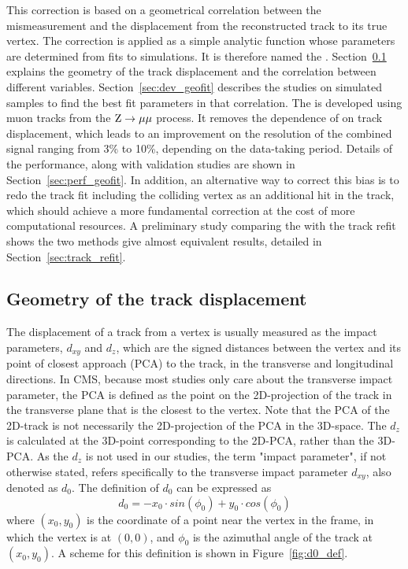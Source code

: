 This correction is based on a geometrical correlation between the \pt mismeasurement 
and the displacement from the reconstructed track to its true vertex.
The correction is applied as a simple analytic function whose parameters are determined from fits to simulations.
It is therefore named the \GeoFit.
Section~\ref{sec:d0_geometry} explains the geometry of the track displacement and the correlation between different variables.
Section~\ref{sec:dev_geofit} describes the studies on simulated samples to find the best fit parameters in that correlation.
The \GeoFit is developed using muon tracks from the $\mathrm{Z} \to \mu\mu$ process.
It removes the dependence of \mmm on track displacement, which leads to an 
improvement on the \mmm resolution of the combined signal ranging from 3\% to 10\%, depending on the data-taking period.
Details of the \GeoFit performance, along with validation studies are shown in Section~\ref{sec:perf_geofit}.
In addition, an alternative way to correct this \pt bias is to redo the track fit including the colliding vertex as an additional hit in the track, 
which should achieve a more fundamental correction at the cost of more computational resources.
A preliminary study comparing the \GeoFit with the track refit shows the two methods give almost equivalent results,
detailed in Section~\ref{sec:track_refit}.


\subsection{Geometry of the track displacement}\label{sec:d0_geometry}

The displacement of a track from a vertex is usually measured as the impact parameters, $d_{xy}$ and $d_{z}$,
which are the signed distances between the vertex and its point of closest approach (PCA) to the track, in the transverse and longitudinal directions.
In CMS, because most studies only care about the transverse impact parameter, 
the PCA is defined as the point on the 2D-projection of the track in the transverse plane that is the closest to the vertex.
Note that the PCA of the 2D-track is not necessarily the 2D-projection of the PCA in the 3D-space. 
The $d_{z}$ is calculated at the 3D-point corresponding to the 2D-PCA, rather than the 3D-PCA.
As the $d_{z}$ is not used in our studies, the term "impact parameter", if not otherwise stated,
refers specifically to the transverse impact parameter $d_{xy}$, also denoted as $d_{0}$.
The definition of $d_0$ can be expressed as 
\begin{equation}\label{eq:d0_def}
  d_0 = -x_{0} \cdot sin(\phi_{0}) + y_{0} \cdot cos(\phi_{0})
\end{equation}
where $(x_{0}, y_{0})$ is the coordinate of a point near the vertex in the frame, in which the vertex is at $(0,0)$, 
and $\phi_{0}$ is the azimuthal angle of the track at $(x_{0}, y_{0})$.
A scheme for this definition is shown in Figure~\ref{fig:d0_def}.

